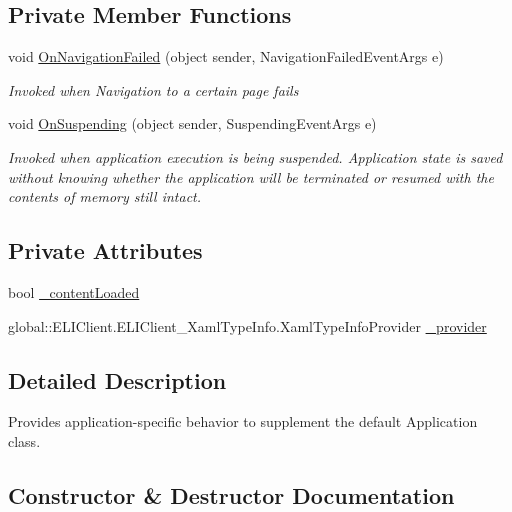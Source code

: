 \subsection*{Private Member Functions}
\begin{DoxyCompactItemize}
\item 
void \hyperlink{class_e_l_i_client_1_1_app_ad896e74a73c15a4c53a628ea649a7947}{On\+Navigation\+Failed} (object sender, Navigation\+Failed\+Event\+Args e)
\begin{DoxyCompactList}\small\item\em Invoked when Navigation to a certain page fails \end{DoxyCompactList}\item 
void \hyperlink{class_e_l_i_client_1_1_app_add9bb2e9df2fdb41f313d82ca31e9698}{On\+Suspending} (object sender, Suspending\+Event\+Args e)
\begin{DoxyCompactList}\small\item\em Invoked when application execution is being suspended. Application state is saved without knowing whether the application will be terminated or resumed with the contents of memory still intact. \end{DoxyCompactList}\end{DoxyCompactItemize}
\subsection*{Private Attributes}
\begin{DoxyCompactItemize}
\item 
bool \hyperlink{class_e_l_i_client_1_1_app_a06d0657cd49a58827f79a5b83ba5a735}{\+\_\+content\+Loaded}
\item 
global\+::\+E\+L\+I\+Client.\+E\+L\+I\+Client\+\_\+\+Xaml\+Type\+Info.\+Xaml\+Type\+Info\+Provider \hyperlink{class_e_l_i_client_1_1_app_a887900e64d9df92432d52ea4f697cf81}{\+\_\+provider}
\end{DoxyCompactItemize}


\subsection{Detailed Description}
Provides application-\/specific behavior to supplement the default Application class. 



\subsection{Constructor \& Destructor Documentation}
\mbox{\label{class_e_l_i_client_1_1_app_a52a059fbb9e595be564bef577ce1fcb9}} 
